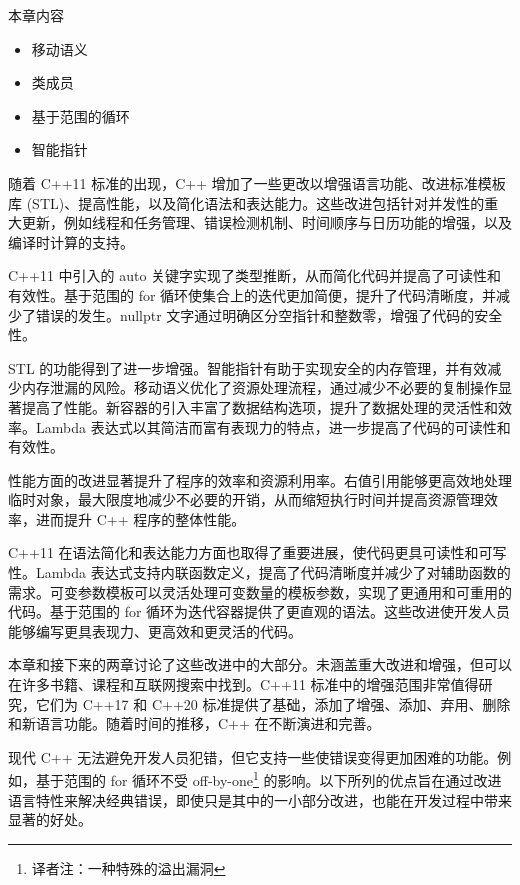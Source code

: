 本章内容

\begin{itemize}
\item
移动语义

\item
类成员

\item
基于范围的循环

\item
智能指针
\end{itemize}

随着 C++11 标准的出现，C++ 增加了一些更改以增强语言功能、改进标准模板库 (STL)、提高性能，以及简化语法和表达能力。这些改进包括针对并发性的重大更新，例如线程和任务管理、错误检测机制、时间顺序与日历功能的增强，以及编译时计算的支持。

C++11 中引入的 auto 关键字实现了类型推断，从而简化代码并提高了可读性和有效性。基于范围的 for 循环使集合上的迭代更加简便，提升了代码清晰度，并减少了错误的发生。nullptr 文字通过明确区分空指针和整数零，增强了代码的安全性。

STL 的功能得到了进一步增强。智能指针有助于实现安全的内存管理，并有效减少内存泄漏的风险。移动语义优化了资源处理流程，通过减少不必要的复制操作显著提高了性能。新容器的引入丰富了数据结构选项，提升了数据处理的灵活性和效率。Lambda 表达式以其简洁而富有表现力的特点，进一步提高了代码的可读性和有效性。

性能方面的改进显著提升了程序的效率和资源利用率。右值引用能够更高效地处理临时对象，最大限度地减少不必要的开销，从而缩短执行时间并提高资源管理效率，进而提升 C++ 程序的整体性能。

C++11 在语法简化和表达能力方面也取得了重要进展，使代码更具可读性和可写性。Lambda 表达式支持内联函数定义，提高了代码清晰度并减少了对辅助函数的需求。可变参数模板可以灵活处理可变数量的模板参数，实现了更通用和可重用的代码。基于范围的 for 循环为迭代容器提供了更直观的语法。这些改进使开发人员能够编写更具表现力、更高效和更灵活的代码。

本章和接下来的两章讨论了这些改进中的大部分。未涵盖重大改进和增强，但可以在许多书籍、课程和互联网搜索中找到。C++11 标准中的增强范围非常值得研究，它们为 C++17 和 C++20 标准提供了基础，添加了增强、添加、弃用、删除和新语言功能。随着时间的推移，C++ 在不断演进和完善。

现代 C++ 无法避免开发人员犯错，但它支持一些使错误变得更加困难的功能。例如，基于范围的 for 循环不受 off-by-one\footnote{译者注：一种特殊的溢出漏洞} 的影响。以下所列的优点旨在通过改进语言特性来解决经典错误，即使只是其中的一小部分改进，也能在开发过程中带来显著的好处。







